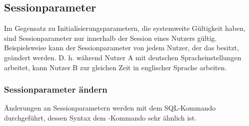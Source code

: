           \begin{literaturinternet}
            \item \cite{i2053602}
          \end{literaturinternet}
      \subsection{Sessionparameter}
        Im Gegensatz zu Initialisierungsparametern, die systemweite Gültigkeit haben, sind Sessionparameter nur innerhalb der Session eines Nutzers gültig. Beispielsweise kann der Sessionparameter  von jedem Nutzer, der das  besitzt, geändert werden. D. h. während Nutzer A mit deutschen Spracheinstellungen arbeitet, kann Nutzer B zur gleichen Zeit in englischer Sprache arbeiten.
        \subsubsection{Sessionparameter ändern}
          Änderungen an Sessionparametern werden mit dem SQL-Kommando  durchgeführt, dessen Syntax dem -Kommando sehr ähnlich ist.

